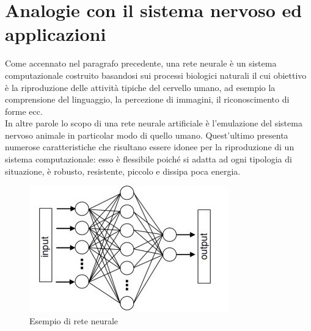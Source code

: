 \documentclass[12pt,a4paper,oneside]{book}
\begin{document}
	\section{Analogie con il sistema nervoso ed applicazioni}
	
		Come accennato nel paragrafo precedente, una rete neurale è un sistema computazionale costruito basandosi sui processi biologici naturali il cui obiettivo è la riproduzione delle attività tipiche del cervello umano, ad esempio la comprensione del linguaggio, la percezione di immagini, il riconoscimento di forme ecc.  \\
		In altre parole lo scopo di una rete neurale artificiale è l’emulazione del sistema nervoso animale in particolar modo di quello umano. Quest'ultimo presenta numerose caratteristiche che risultano essere idonee per la riproduzione di un sistema computazionale: esso è flessibile poiché si adatta ad ogni tipologia di situazione, è robusto, resistente, piccolo e dissipa poca energia.
		
		\begin{figure}[h]
			\centering
			\includegraphics[width=0.5\linewidth]{IMMAGINI/esempioiniziale}
			\caption{Esempio di rete neurale}
			\label{fig:esempio}
		\end{figure}
	
\end{document}
